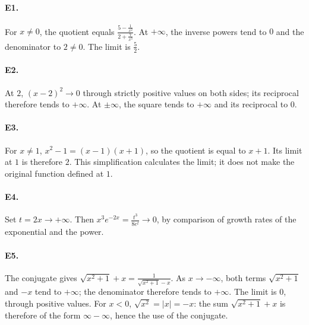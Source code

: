 \paragraph{E1.}For $x\ne0$, the quotient equals $\frac{5-\frac{1}{x^2}}{2+\frac{7}{x^3}}$. At $+\infty$, the inverse powers tend to $0$ and the denominator to $2\ne0$. The limit is $\frac{5}{2}$.

\paragraph{E2.}At $2$, $(x-2)^2\to0$ through strictly positive values on both sides; its reciprocal therefore tends to $+\infty$. At $\pm\infty$, the square tends to $+\infty$ and its reciprocal to $0$.

\paragraph{E3.}For $x\ne1$, $x^2-1=(x-1)(x+1)$, so the quotient is equal to $x+1$. Its limit at $1$ is therefore $2$. This simplification calculates the limit; it does not make the original function defined at $1$.

\paragraph{E4.}Set $t=2x\to+\infty$. Then $x^3e^{-2x}=\frac{t^3}{8e^t}\to0$, by comparison of growth rates of the exponential and the power.

\paragraph{E5.}The conjugate gives $\sqrt{x^2+1}+x=\frac{1}{\sqrt{x^2+1}-x}$. As $x\to-\infty$, both terms $\sqrt{x^2+1}$ and $-x$ tend to $+\infty$; the denominator therefore tends to $+\infty$. The limit is $0$, through positive values. For $x<0$, $\sqrt{x^2}=|x|=-x$: the sum $\sqrt{x^2+1}+x$ is therefore of the form $\infty-\infty$, hence the use of the conjugate.

